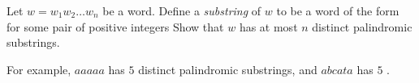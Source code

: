 Let $w = w_1 w_2 \dots w_n$ be a word. Define a \textit{substring} of $w$ to be a word of the form  for some pair of positive integers  Show that $w$ has at most $n$ distinct palindromic substrings.

For example, $aaaaa$ has $5$ distinct palindromic substrings, and $abcata$ has $5$     .